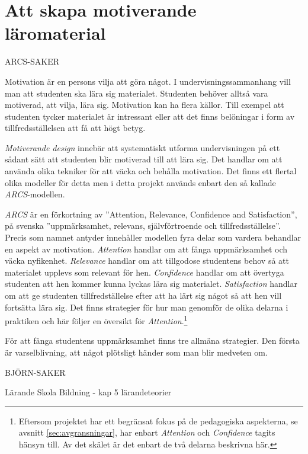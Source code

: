 \section{Att skapa motiverande läromaterial}
\label{sec:arcs}
\begin{binge}
ARCS-SAKER

Motivation är en persons vilja att göra något. I undervisningssammanhang vill man att studenten ska lära sig materialet. Studenten behöver alltså vara motiverad, att vilja, lära sig. Motivation kan ha flera källor. Till exempel att studenten tycker materialet är intressant eller att det finns belöningar i form av tillfredsställelsen att få att högt betyg. 

\textit{Motiverande design} innebär att systematiskt utforma undervisningen på ett sådant sätt att studenten blir motiverad till att lära sig. Det handlar om att använda olika tekniker för att väcka och behålla motivation. Det finns ett flertal olika modeller för detta men i detta projekt används enbart den så kallade \textit{ARCS}-modellen.\cite{arcs_book}

\textit{ARCS} är en förkortning av ''Attention, Relevance, Confidence and Satisfaction'', på svenska ''uppmärksamhet, relevans, självförtroende och tillfredsställelse''. Precis som namnet antyder innehåller modellen fyra delar som vardera behandlar en aspekt av motivation. \textit{Attention} handlar om att fånga uppmärksamhet och väcka nyfikenhet. \textit{Relevance} handlar om att tillgodose studentens behov så att materialet upplevs som relevant för hen. \textit{Confidence} handlar om att övertyga studenten att hen kommer kunna lyckas lära sig materialet. \textit{Satisfaction} handlar om att ge studenten tillfredställelse efter att ha lärt sig något så att hen vill fortsätta lära sig. Det finns strategier för hur man genomför de olika delarna i praktiken och här följer en översikt för \textit{Attention}.\footnote{Eftersom projektet har ett begränsat fokus på de pedagogiska aspekterna, se avsnitt \ref{sec:avgransningar}, har enbart \textit{Attention} och \textit{Confidence} tagits hänsyn till. Av det skälet är det enbart de två delarna beskrivna här.}

För att fånga studentens uppmärksamhet finns tre allmäna strategier. Den första är varselblivning, att något plötsligt händer som man blir medveten om. 



BJÖRN-SAKER

Lärande Skola Bildning - kap 5 lärandeteorier


\end{binge}
